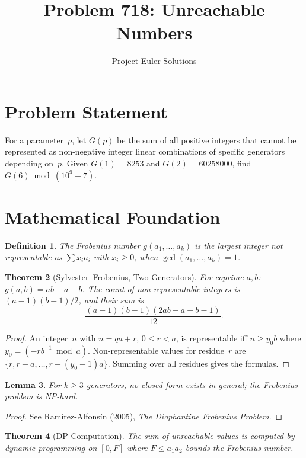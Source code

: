 \documentclass[11pt]{article}
\title{Problem 718: Unreachable Numbers}
\author{Project Euler Solutions}
\date{}
\newtheorem{theorem}{Theorem}
\newtheorem{lemma}[theorem]{Lemma}
\newtheorem{definition}[theorem]{Definition}
\begin{document}
\maketitle

\section{Problem Statement}

For a parameter~$p$, let $G(p)$ be the sum of all positive integers that cannot be represented as non-negative integer linear combinations of specific generators depending on~$p$. Given $G(1)=8253$ and $G(2)=60258000$, find $G(6) \bmod (10^9+7)$.

\section{Mathematical Foundation}

\begin{definition}
The \emph{Frobenius number} $g(a_1,\ldots,a_k)$ is the largest integer not representable as $\sum x_i a_i$ with $x_i \ge 0$, when $\gcd(a_1,\ldots,a_k)=1$.
\end{definition}

\begin{theorem}[Sylvester--Frobenius, Two Generators]
For coprime $a,b$: $g(a,b) = ab - a - b$. The count of non-representable integers is $(a-1)(b-1)/2$, and their sum is
\[
\frac{(a-1)(b-1)(2ab-a-b-1)}{12}.
\]
\end{theorem}

\begin{proof}
An integer~$n$ with $n = qa + r$, $0 \le r < a$, is representable iff $n \ge y_0 b$ where $y_0 = (-r b^{-1} \bmod a)$. Non-representable values for residue~$r$ are $\{r, r+a, \ldots, r+(y_0-1)a\}$. Summing over all residues gives the formulas.
\end{proof}

\begin{lemma}
For $k \ge 3$ generators, no closed form exists in general; the Frobenius problem is NP-hard.
\end{lemma}

\begin{proof}
See Ram\'irez-Alfons\'in (2005), \emph{The Diophantine Frobenius Problem}.
\end{proof}

\begin{theorem}[DP Computation]
The sum of unreachable values is computed by dynamic programming on $[0, F]$ where $F \le a_1 a_2$ bounds the Frobenius number.
\end{theorem}
\end{document}
